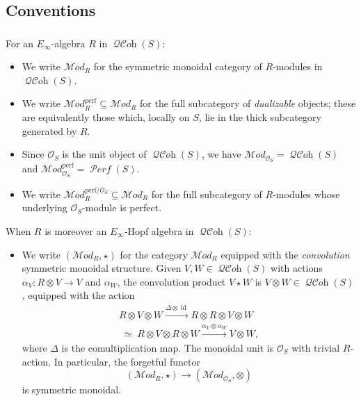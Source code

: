 \documentclass[12pt, oneside]{amsart}
\numberwithin{equation}{section}
\theoremstyle{remark}
\theoremstyle{plain}
\newcommand{\MOD}{\mathcal{M}\textit{od}}
\DeclareMathOperator{\QCOH}{\mathcal{QC}\textit{oh}}
\DeclareMathOperator{\PERF}{\mathcal{P}\textit{erf}}
\newcommand{\OO}{\mathcal{O}}
\begin{document}
\subsection{Conventions}

\subsubsection{}\label{sssec:module conventions}

For an $E_\infty$-algebra $R$ in $\QCOH(S)$:

\begin{itemize}
	\item We write $\MOD_R$ for the symmetric monoidal category of $R$-modules in $\QCOH(S)$.
	\item We write $\MOD_R^{\mathrm{perf}} \subseteq \MOD_R$ for the full subcategory of \emph{dualizable} objects; these are equivalently those which, locally on $S$, lie in the thick subcategory generated by $R$.
	\item Since $\OO_S$ is the unit object of $\QCOH(S)$, we have $\MOD_{\OO_S} = \QCOH(S)$ and $\MOD_{\OO_S}^{\mathrm{perf}} = \PERF(S)$.
	\item We write $\MOD_R^{\mathrm{perf}/\OO_S} \subseteq \MOD_R$ for the full subcategory of $R$-modules whose underlying $\OO_S$-module is perfect.
\end{itemize}
When $R$ is moreover an $E_\infty$-Hopf algebra in $\QCOH(S)$:
\begin{itemize}
  \item We write $(\MOD_R, \star)$ for the category $\MOD_R$ equipped with the \emph{convolution} symmetric monoidal structure.
	Given $V, W \in \QCOH(S)$ with actions $\alpha_V : R \otimes V \to V$ and $\alpha_W$, the convolution product $V \star W$ is $V \otimes W \in \QCOH(S)$, equipped with the action
  \[\begin{multlined}
     R \otimes V \otimes W \xrightarrow{\Delta \otimes \operatorname{id}} R \otimes R \otimes V \otimes W
     \\\;\simeq\; R \otimes V \otimes R \otimes W \xrightarrow{\alpha_V \otimes \alpha_W} V \otimes W,
  \end{multlined}\]
  where $\Delta$ is the comultiplication map.
  The monoidal unit is $\OO_S$ with trivial $R$-action.
	In particular, the forgetful functor
	$$(\MOD_{R}, \star) \to (\MOD_{\OO_S}, \otimes)$$
	is symmetric monoidal.
\end{itemize}
\end{document}
